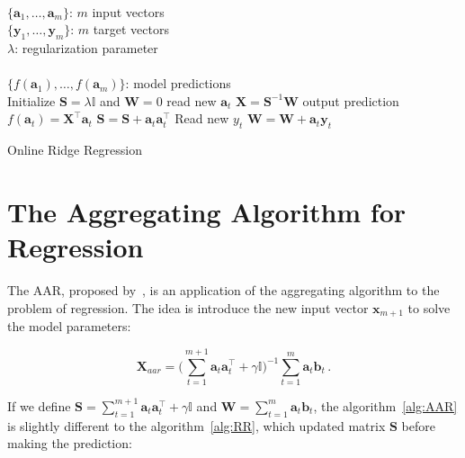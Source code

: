 \begin{algorithm}[H]
\begin{algorithmic}[1]
\REQUIRE $\,$ \\
$\{\mathbf{a}_1,\dots,\mathbf{a}_{m} \}$: $m$ input vectors \\
$\{\mathbf{y}_1,\dots,\mathbf{y}_{m} \}$: $m$ target vectors \\
$\lambda$: regularization parameter \\
\ENSURE  $\,$ \\
$\{f(\mathbf{a}_1),\dots,f(\mathbf{a}_{m}) \}$: model predictions \\
\STATE Initialize $\mathbf{S}=\lambda \mathbb{I}$
and $\mathbf{W}=0$
	\STATE read new $\mathbf{a}_t$
	\STATE $\mathbf{X}=\mathbf{S}^{-1}\mathbf{W}$
	\STATE output prediction $f(\mathbf{a}_t) = \mathbf{X}^\top \mathbf{a}_t$
   	\STATE $\mathbf{S} = \mathbf{S} + \mathbf{a}_t \mathbf{a}_t^\top$
   	\STATE Read new $y_t$
    	\STATE $\mathbf{W} = \mathbf{W} + \mathbf{a}_t \mathbf{y}_t$
\ENDFOR
\end{algorithmic}
\caption{Online Ridge Regression}
\label{alg:RR}
\end{algorithm}



\section{The Aggregating Algorithm for Regression}

The AAR, proposed by~\cite{vovk2001}, is an application of the aggregating
algorithm to the problem of regression. The idea is introduce the new input
vector $\mathbf{x}_{m+1}$ to solve the model parameters: 

\begin{equation}
\label{eq:AARexpand}
\mathbf{X}_{aar} = \displaystyle \big (\sum_{t=1}^{m+1}
\mathbf{a}_t \mathbf{a}_t  ^\intercal + \gamma \mathbb{I}\big )^{-1}
\sum_{t=1}^m \mathbf{a}_t \mathbf{b}_t \, .
\end{equation}

If we define $\displaystyle\mathbf{S}= \sum_{t=1}^{m+1} \mathbf{a}_t
\mathbf{a}_t  ^\intercal + \gamma \mathbb{I} $ and $\mathbf{W}=
\displaystyle\sum_{t=1}^m \mathbf{a}_t \mathbf{b}_t$, the
algorithm~\ref{alg:AAR} is slightly different to the algorithm~\ref{alg:RR}, 
which updated matrix $\mathbf{S}$ before making the prediction:

